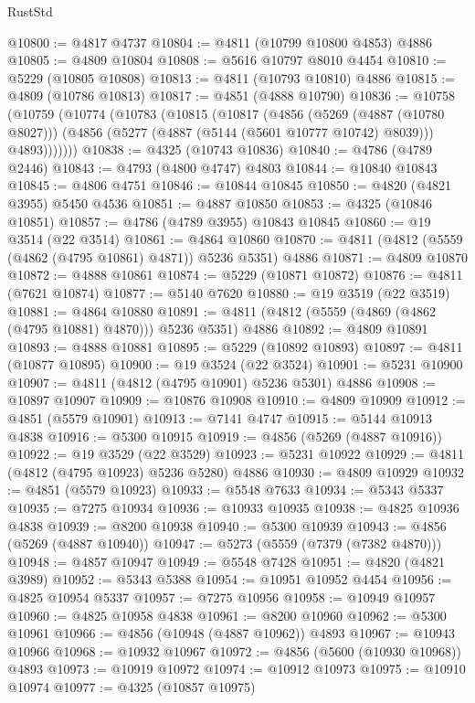 \begin{lexlean}{RustStd}
\begin{coremodule}
@10800 := @4817 @4737
@10804 := @4811 (@10799 @10800 @4853) @4886
@10805 := @4809 @10804
@10808 := @5616 @10797 @8010 @4454
@10810 := @5229 (@10805 @10808)
@10813 := @4811 (@10793 @10810) @4886
@10815 := @4809 (@10786 @10813)
@10817 := @4851 (@4888 @10790)
@10836 := @10758
    (@10759
      (@10774
        (@10783
          (@10815
            (@10817
              (@4856
                (@5269 (@4887 (@10780 @8027)))
                (@4856 (@5277 (@4887 (@5144 (@5601 @10777 @10742) @8039))) @4893)))))))
@10838 := @4325 (@10743 @10836)
@10840 := @4786 (@4789 @2446)
@10843 := @4793 (@4800 @4747) @4803
@10844 := @10840 @10843
@10845 := @4806 @4751
@10846 := @10844 @10845
@10850 := @4820 (@4821 @3955) @5450 @4536
@10851 := @4887 @10850
@10853 := @4325 (@10846 @10851)
@10857 := @4786 (@4789 @3955) @10843 @10845
@10860 := @19 @3514 (@22 @3514)
@10861 := @4864 @10860
@10870 := @4811 (@4812 (@5559 (@4862 (@4795 @10861) @4871)) @5236 @5351) @4886
@10871 := @4809 @10870
@10872 := @4888 @10861
@10874 := @5229 (@10871 @10872)
@10876 := @4811 (@7621 @10874)
@10877 := @5140 @7620
@10880 := @19 @3519 (@22 @3519)
@10881 := @4864 @10880
@10891 := @4811 (@4812 (@5559 (@4869 (@4862 (@4795 @10881) @4870))) @5236 @5351) @4886
@10892 := @4809 @10891
@10893 := @4888 @10881
@10895 := @5229 (@10892 @10893)
@10897 := @4811 (@10877 @10895)
@10900 := @19 @3524 (@22 @3524)
@10901 := @5231 @10900
@10907 := @4811 (@4812 (@4795 @10901) @5236 @5301) @4886
@10908 := @10897 @10907
@10909 := @10876 @10908
@10910 := @4809 @10909
@10912 := @4851 (@5579 @10901)
@10913 := @7141 @4747
@10915 := @5144 @10913 @4838
@10916 := @5300 @10915
@10919 := @4856 (@5269 (@4887 @10916))
@10922 := @19 @3529 (@22 @3529)
@10923 := @5231 @10922
@10929 := @4811 (@4812 (@4795 @10923) @5236 @5280) @4886
@10930 := @4809 @10929
@10932 := @4851 (@5579 @10923)
@10933 := @5548 @7633
@10934 := @5343 @5337
@10935 := @7275 @10934
@10936 := @10933 @10935
@10938 := @4825 @10936 @4838
@10939 := @8200 @10938
@10940 := @5300 @10939
@10943 := @4856 (@5269 (@4887 @10940))
@10947 := @5273 (@5559 (@7379 (@7382 @4870)))
@10948 := @4857 @10947
@10949 := @5548 @7428
@10951 := @4820 (@4821 @3989)
@10952 := @5343 @5388
@10954 := @10951 @10952 @4454
@10956 := @4825 @10954 @5337
@10957 := @7275 @10956
@10958 := @10949 @10957
@10960 := @4825 @10958 @4838
@10961 := @8200 @10960
@10962 := @5300 @10961
@10966 := @4856 (@10948 (@4887 @10962)) @4893
@10967 := @10943 @10966
@10968 := @10932 @10967
@10972 := @4856 (@5600 (@10930 @10968)) @4893
@10973 := @10919 @10972
@10974 := @10912 @10973
@10975 := @10910 @10974
@10977 := @4325 (@10857 @10975)

\end{coremodule}
\end{lexlean}
